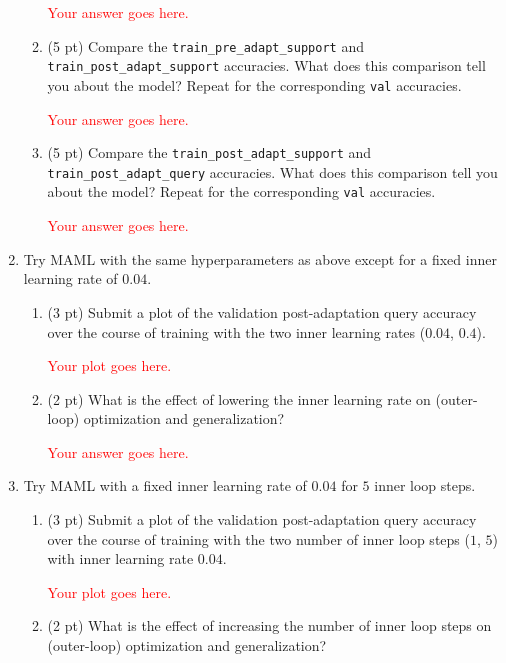 \documentclass[12pt]{article}
\begin{document}
\begin{enumerate}
\begin{enumerate}[label=(\alph*)]
        \textcolor{red}{Your answer goes here.}

    
        \item (5 pt) Compare the \texttt{train\_pre\_adapt\_support} and \texttt{train\_post\_adapt\_support} accuracies. What does this comparison tell you about the model? Repeat for the corresponding \texttt{val} accuracies.

        \textcolor{red}{Your answer goes here.}
        
        \item (5 pt) Compare the \texttt{train\_post\_adapt\_support} and \texttt{train\_post\_adapt\_query} accuracies. What does this comparison tell you about the model? Repeat for the corresponding \texttt{val} accuracies.
        
        \textcolor{red}{Your answer goes here.}

    \end{enumerate}

    \newpage
    \item Try MAML with the same hyperparameters as above except for a fixed inner learning rate of $0.04$.
    \begin{enumerate}[label=(\alph*)]
        \item (3 pt) Submit a plot of the validation post-adaptation query accuracy over the course of training with the two inner learning rates ($0.04$, $0.4$).
        
        \textcolor{red}{Your plot goes here.}


        \item (2 pt) What is the effect of lowering the inner learning rate on (outer-loop) optimization and generalization?

        \textcolor{red}{Your answer goes here.}

    \end{enumerate}
    
    \newpage
    \item Try MAML with a fixed inner learning rate of $0.04$ for $5$ inner loop steps.
    \begin{enumerate}[label=(\alph*)]
        \item (3 pt) Submit a plot of the validation post-adaptation query accuracy over the course of training with the two number of inner loop steps ($1$, $5$) with inner learning rate $0.04$.
  
        \textcolor{red}{Your plot goes here.}

        \item (2 pt) What is the effect of increasing the number of inner loop steps on (outer-loop) optimization and generalization?
        

\end{enumerate}
\end{enumerate}
\end{document}
